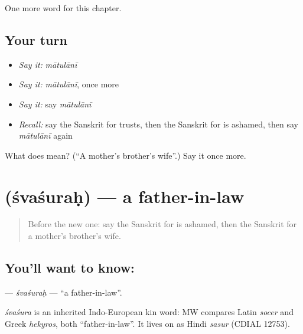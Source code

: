 \begin{grammarlens}[title={What you've built}]
One more word for this chapter.
\end{grammarlens}

\subsection*{Your turn}
\begin{itemize}
\raggedright
  \item \emph{Say it:} \emph{mātulānī}
  \item \emph{Say it:} \emph{mātulānī}, once more
  \item \emph{Say it:} say \emph{mātulānī}
  \item \emph{Recall:} say the Sanskrit for trusts, then the Sanskrit for is ashamed, then say \emph{mātulānī} again
\end{itemize}

\begin{tcolorbox}[breakable,colback=teal!4,colframe=teal!35!black,title={Before you move on}]
What does  mean? (\textquotedblleft{}A mother's brother's wife\textquotedblright{}.) Say it once more.
\end{tcolorbox}
\section[\texorpdfstring{\sk{श्वशुरः} (śvaśuraḥ)}{श्वशुरः (śvaśuraḥ)}]{ (śvaśuraḥ) — a father-in-law}

\label{lesson:SA-C178-svasurah}



\begin{quote}
Before the new one: say the Sanskrit for is ashamed, then the Sanskrit for a mother's brother's wife.
\end{quote}

\subsection*{You'll want to know: }
\textbf{} — \emph{śvaśuraḥ} — \textquotedblleft{}a father-in-law\textquotedblright{}.

\begin{cousinweb}
\emph{śvaśura} is an inherited Indo-European kin word: MW compares Latin \emph{socer} and Greek \emph{hekyros}, both \textquotedblleft{}father-in-law\textquotedblright{}. It lives on as Hindi \emph{sasur} (CDIAL 12753).
\end{cousinweb}

